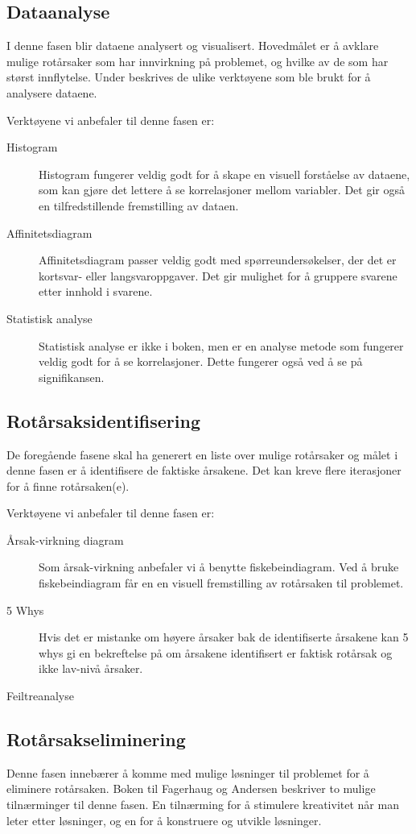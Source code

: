 \subsection{Dataanalyse}
I denne fasen blir dataene analysert og visualisert. Hovedmålet er å avklare mulige rotårsaker som har innvirkning på problemet, og hvilke av de som har størst innflytelse. Under beskrives de ulike verktøyene som ble brukt for å analysere dataene.

Verktøyene vi anbefaler til denne fasen er:
\begin{description}
    \item[Histogram] Histogram fungerer veldig godt for å skape en visuell forståelse av dataene, som kan gjøre det lettere å se korrelasjoner mellom variabler. Det gir også en tilfredstillende fremstilling av dataen. 
    \item[Affinitetsdiagram] Affinitetsdiagram passer veldig godt med spørreundersøkelser, der det er kortsvar- eller langsvaroppgaver. Det gir mulighet for å gruppere svarene etter innhold i svarene. 
    \item[Statistisk analyse] Statistisk analyse er ikke i boken, men er en analyse metode som fungerer veldig godt for å se korrelasjoner. Dette fungerer også ved å se på signifikansen.
\end{description}

\subsection{Rotårsaksidentifisering}
De foregående fasene skal ha generert en liste over mulige rotårsaker og målet i denne fasen er å identifisere de faktiske årsakene. Det kan kreve flere iterasjoner for å finne rotårsaken(e). 

Verktøyene vi anbefaler til denne fasen er:
\begin{description}
    \item[Årsak-virkning diagram] Som årsak-virkning anbefaler vi å benytte fiskebeindiagram. Ved å bruke fiskebeindiagram får en en visuell fremstilling av rotårsaken til problemet. 
    \item[5 Whys] Hvis det er mistanke om høyere årsaker bak de identifiserte årsakene kan 5 whys gi en bekreftelse på om årsakene identifisert er faktisk rotårsak og ikke lav-nivå årsaker. 
    \item[Feiltreanalyse] 
\end{description}

\subsection{Rotårsakseliminering}
Denne fasen innebærer å komme med mulige løsninger til problemet for å eliminere rotårsaken. Boken til Fagerhaug og Andersen \cite{RCA} beskriver to mulige tilnærminger til denne fasen. En tilnærming for å stimulere kreativitet når man leter etter løsninger, og en for å konstruere og utvikle løsninger.

